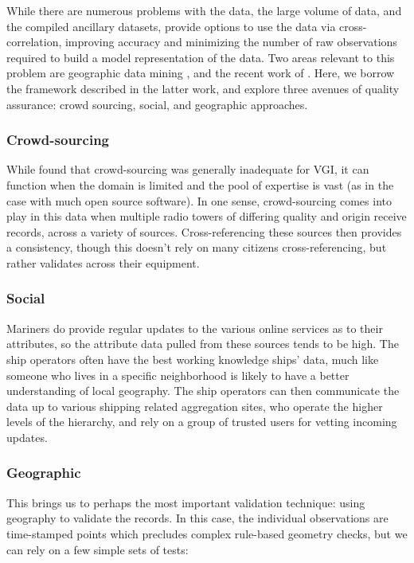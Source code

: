 While there are numerous problems with the data, the large volume of data, and the compiled ancillary datasets, provide options to use the data via cross-correlation, improving accuracy and minimizing the number of raw observations required to build a model representation of the data. Two areas relevant to this problem are geographic data mining \citep{miller2009geographic}, and the recent work of \citep{goodchildli2012}. Here, we borrow the framework described in the latter work, and explore three avenues of quality assurance: crowd sourcing, social, and geographic approaches.

\subsubsection{Crowd-sourcing}
While \citep{goodchildli2012} found that crowd-sourcing was generally inadequate for VGI, it can function when the domain is limited and the pool of expertise is vast (as in the case with much open source software). In one sense, crowd-sourcing comes into play in this data when multiple radio towers of differing quality and origin receive records, across a variety of sources. Cross-referencing these sources then provides a consistency, though this doesn't rely on many citizens cross-referencing, but rather validates across their equipment.

\subsubsection{Social}
Mariners do provide regular updates to the various online services as to their attributes, so the attribute data pulled from these sources tends to be high. The ship operators often have the best working knowledge ships' data, much like someone who lives in a specific neighborhood is likely to have a better understanding of local geography. The ship operators can then communicate the data up to various shipping related aggregation sites, who operate the higher levels of the hierarchy, and rely on a group of trusted users for vetting incoming updates.

\subsubsection{Geographic}
This brings us to perhaps the most important validation technique: using geography to validate the records. In this case, the individual observations are time-stamped points which precludes complex rule-based geometry checks, but we can rely on a few simple sets of tests:

